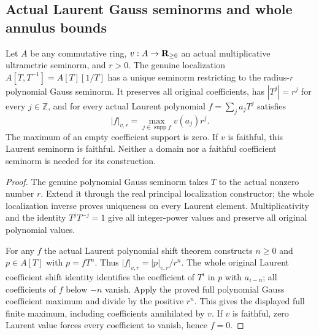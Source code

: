\subsection{Actual Laurent Gauss seminorms and whole annulus bounds}
\begin{theorem}
\label{spectrum:actual-laurent-gauss-valuation}
\leanok
Let $A$ be any commutative ring, $v:A\to\mathbf{R}_{\ge0}$ an actual
multiplicative ultrametric seminorm, and $r>0$. The genuine
localization $A[T,T^{-1}]=A[T][1/T]$ has a unique seminorm
restricting to the radius-$r$ polynomial Gauss seminorm. It preserves
all original coefficients, has $|T^j|=r^j$ for every $j\in\mathbb{Z}$,
and for every actual Laurent polynomial $f=\sum_j a_jT^j$ satisfies
\[
 |f|_{v,r}=\max_{j\in\operatorname{supp}f}v(a_j)r^j.
\]
The maximum of an empty coefficient support is zero. If $v$ is
faithful, this Laurent seminorm is faithful. Neither a domain nor
a faithful coefficient seminorm is needed for its construction.
\end{theorem}
\begin{proof}
The genuine polynomial Gauss seminorm takes $T$ to the actual
nonzero number $r$. Extend it through the real principal
localization constructor; the whole localization inverse proves
uniqueness on every Laurent element. Multiplicativity and the
identity $T^jT^{-j}=1$ give all integer-power values and preserve
all original polynomial values.

For any $f$ the actual Laurent polynomial shift theorem constructs
$n\ge0$ and $p\in A[T]$ with $p=fT^n$. Thus
$|f|_{v,r}=|p|_{v,r}/r^n$. The whole original Laurent coefficient
shift identity identifies the coefficient of $T^i$ in $p$ with
$a_{i-n}$; all coefficients of $f$ below $-n$ vanish. Apply the
proved full polynomial Gauss coefficient maximum and divide by
the positive $r^n$. This gives the displayed full finite maximum,
including coefficients annihilated by $v$. If $v$ is faithful,
zero Laurent value forces every coefficient to vanish, hence
$f=0$.
\end{proof}

